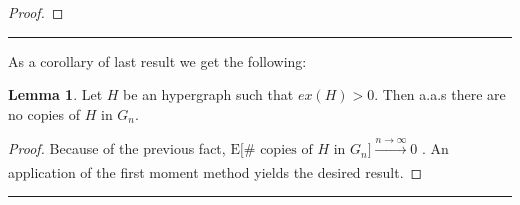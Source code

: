 \documentclass[12pt,notitlepage,a4paper]{article}
\theoremstyle{definition}
\newtheorem{lemma}{Lemma}[section]
\newcommand{\N}{\mathbb{N}}
\newcommand{\Ln}{\lim\limits_{n\to \infty}}
\newcommand{\sep}{\noindent\rule{2cm}{0.4pt}}
\newcommand{\aut}{\mathrm{aut}}
\begin{document}
\begin{proof}
\end{proof}
\sep

As a corollary of last result we get the following:  
\begin{lemma} \label{lem:nocopiesdense}
	Let $H$ be an hypergraph such that $ex(H)>0$. Then
	a.a.s there are no copies of $H$ in $G_n$. 
\end{lemma}  
\begin{proof}
	Because of the previous fact, 
	$\mathrm{E}\big[\# \text{ copies of }H \text{ in } G_n\big] 
	\xrightarrow[]{n\to \infty} 0$ . An application of the first moment
	method yields the desired result. 
\end{proof} 
\sep
\end{document}
